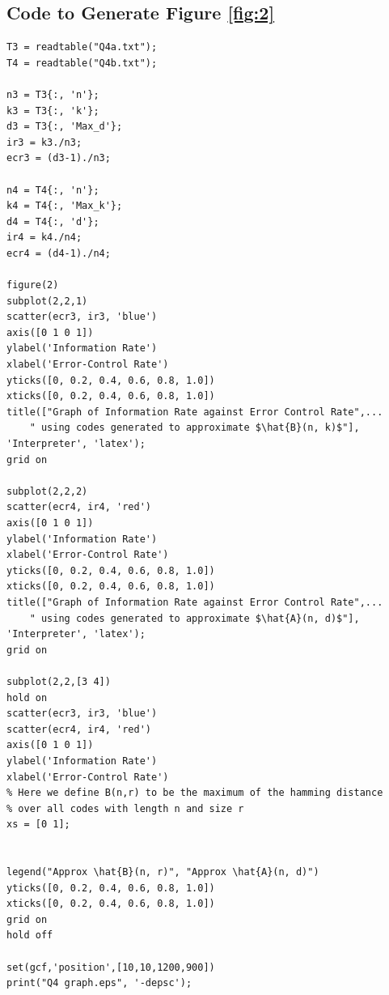 \documentclass[11pt]{article} %
\begin{document}
\subsection*{Code to Generate Figure \ref{fig:2}}
\begin{lstlisting}
T3 = readtable("Q4a.txt");
T4 = readtable("Q4b.txt");

n3 = T3{:, 'n'};
k3 = T3{:, 'k'};
d3 = T3{:, 'Max_d'};
ir3 = k3./n3;
ecr3 = (d3-1)./n3;

n4 = T4{:, 'n'};
k4 = T4{:, 'Max_k'};
d4 = T4{:, 'd'};
ir4 = k4./n4;
ecr4 = (d4-1)./n4;

figure(2)
subplot(2,2,1)
scatter(ecr3, ir3, 'blue')
axis([0 1 0 1])
ylabel('Information Rate') 
xlabel('Error-Control Rate')
yticks([0, 0.2, 0.4, 0.6, 0.8, 1.0])
xticks([0, 0.2, 0.4, 0.6, 0.8, 1.0])
title(["Graph of Information Rate against Error Control Rate",...
    " using codes generated to approximate $\hat{B}(n, k)$"], 'Interpreter', 'latex');
grid on

subplot(2,2,2) 
scatter(ecr4, ir4, 'red')
axis([0 1 0 1])
ylabel('Information Rate') 
xlabel('Error-Control Rate')
yticks([0, 0.2, 0.4, 0.6, 0.8, 1.0])
xticks([0, 0.2, 0.4, 0.6, 0.8, 1.0])
title(["Graph of Information Rate against Error Control Rate",...
    " using codes generated to approximate $\hat{A}(n, d)$"], 'Interpreter', 'latex');
grid on

subplot(2,2,[3 4])
hold on
scatter(ecr3, ir3, 'blue')
scatter(ecr4, ir4, 'red')
axis([0 1 0 1])
ylabel('Information Rate') 
xlabel('Error-Control Rate')
% Here we define B(n,r) to be the maximum of the hamming distance
% over all codes with length n and size r
xs = [0 1];


legend("Approx \hat{B}(n, r)", "Approx \hat{A}(n, d)")
yticks([0, 0.2, 0.4, 0.6, 0.8, 1.0])
xticks([0, 0.2, 0.4, 0.6, 0.8, 1.0])
grid on
hold off

set(gcf,'position',[10,10,1200,900])
print("Q4 graph.eps", '-depsc');
\end{lstlisting}
\end{document}

